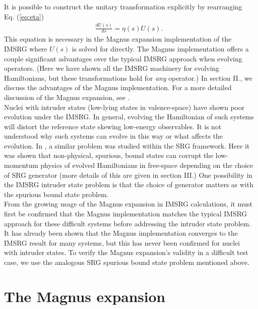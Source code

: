 \documentclass[preprintnumbers,floatfix,aps,prc,preprint]{revtex4-1}
\begin{document}
It is possible to construct the unitary transformation explicitly by rearranging Eq. (\ref{eq:eta})
%
\begin{eqnarray}
\label{eq:unitary_trans}
\frac{dU(s)}{ds} = \eta(s) U(s).
\end{eqnarray}
%
This equation is necessary in the Magnus expansion implementation of the IMSRG where $U(s)$ is solved for directly. The Magnus implementation offers a couple significant advantages over the typical IMSRG approach when evolving operators. (Here we have shown all the IMSRG machinery  for evolving Hamiltonians, but these transformations hold for {\it any} operator.) In section II., we discuss the advantages of the Magnus implementation. For a more detailed discussion of the Magnus expansion, see \cite{Morris:2015}. \\

Nuclei with intruder states (low-lying states in valence-space) have shown poor evolution under the IMSRG. In general, evolving the Hamiltonian of such systems will distort the reference state skewing low-energy observables. It is not understood why such systems can evolve in this way or what affects the evolution. In \cite{Glazek:2008,Wendt:2011}, a similar problem was studied within the SRG framework. Here it was shown that non-physical, spurious, bound states can corrupt the low-momentum physics of evolved Hamiltonians in free-space depending on the choice of SRG generator (more details of this are given in section III.) One possibility in the IMSRG intruder state problem is that the choice of generator matters as with the spurious bound state problem. \\

From the growing usage of the Magnus expansion in IMSRG calculations, it must first be confirmed that the Magnus implementation matches the typical IMSRG approach for these difficult systems before addressing the intruder state problem. It has already been shown that the Magnus implementation converges to the IMSRG result for many systems, but this has never been confirmed for nuclei with intruder states. To verify the Magnus expansion's validity in a difficult test case, we use the analogous SRG spurious bound state problem mentioned above. 

\section{The Magnus expansion}
\label{sec:magnus}
\end{document}
